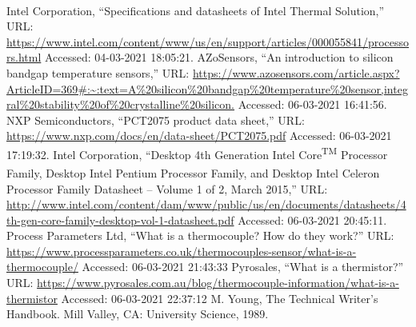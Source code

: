 \documentclass[conference]{IEEEtran}
\begin{document}
\begin{thebibliography}{00}
 Intel Corporation, ``Specifications and datasheets of Intel\textsuperscript{\tiny\textregistered} Thermal Solution,'' URL: \url{https://www.intel.com/content/www/us/en/support/articles/000055841/processors.html} Accessed: 04-03-2021 18:05:21.
 AZoSensors, ``An introduction to silicon bandgap temperature sensors,'' URL: \url{https://www.azosensors.com/article.aspx?ArticleID=369#:~:text=A%20silicon%20bandgap%20temperature%20sensor,integral%20stability%20of%20crystalline%20silicon.} Accessed: 06-03-2021 16:41:56.
 NXP Semiconductors, ``PCT2075 product data sheet,'' URL: \url{https://www.nxp.com/docs/en/data-sheet/PCT2075.pdf} Accessed: 06-03-2021 17:19:32.
 Intel Corporation, ``Desktop 4th Generation Intel\textsuperscript{\tiny\textregistered} Core\textsuperscript{\tiny TM} Processor Family, Desktop Intel\textsuperscript{\tiny\textregistered} Pentium\textsuperscript{\tiny\textregistered} Processor Family, and Desktop Intel\textsuperscript{\tiny\textregistered} Celeron\textsuperscript{\tiny\textregistered} Processor Family Datasheet – Volume 1 of 2, March 2015,'' URL: \url{http://www.intel.com/content/dam/www/public/us/en/documents/datasheets/4th-gen-core-family-desktop-vol-1-datasheet.pdf} Accessed: 06-03-2021 20:45:11.
 Process Parameters Ltd, ``What is a thermocouple? How do they work?'' URL: \url{https://www.processparameters.co.uk/thermocouples-sensor/what-is-a-thermocouple/} Accessed: 06-03-2021 21:43:33
 Pyrosales, ``What is a thermistor?'' URL: \url{https://www.pyrosales.com.au/blog/thermocouple-information/what-is-a-thermistor} Accessed: 06-03-2021 22:37:12
 M. Young, The Technical Writer's Handbook. Mill Valley, CA: University Science, 1989.
\end{thebibliography}
\end{document}
